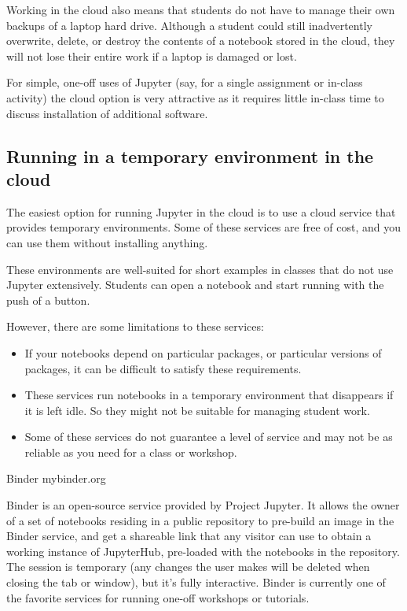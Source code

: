 \documentclass[]{book}
\let\BeginKnitrBlock\begin \let\EndKnitrBlock\end
\begin{document}
Working in the cloud also means that students do not have to manage
their own backups of a laptop hard drive. Although a student could
still inadvertently overwrite, delete, or destroy the contents of a
notebook stored in the cloud, they will not lose their entire work if
a laptop is damaged or lost.

For simple, one-off uses of Jupyter (say, for a single assignment or
in-class activity) the cloud option is very attractive as it requires
little in-class time to discuss installation of additional software.

\hypertarget{running-in-a-temporary-environment-in-the-cloud}{%
\subsection{Running in a temporary environment in the cloud}\label{running-in-a-temporary-environment-in-the-cloud}}

The easiest option for running Jupyter in the cloud is to use a cloud
service that provides temporary environments. Some of these services
are free of cost, and you can use them without installing anything.

These environments are well-suited for short examples in classes that
do not use Jupyter extensively. Students can open a notebook and
start running with the push of a button.

However, there are some limitations to these services:

\begin{itemize}
\item
  If your notebooks depend on particular packages, or particular
  versions of packages, it can be difficult to satisfy these
  requirements.
\item
  These services run notebooks in a temporary environment that
  disappears if it is left idle. So they might not be suitable for
  managing student work.
\item
  Some of these services do not guarantee a level of service and may
  not be as reliable as you need for a class or workshop.
\end{itemize}

\BeginKnitrBlock{rmdnote}
Binder mybinder.org

Binder is an
open-source service provided by Project Jupyter. It allows the
owner of a set of notebooks residing in a public repository to
pre-build an image in the Binder service, and get a shareable
link that any visitor can use to obtain a working instance of
JupyterHub, pre-loaded with the notebooks in the repository. The session is
temporary (any changes the user makes will be deleted when
closing the tab or window), but it's fully interactive. Binder
is currently one of the favorite services for running one-off
workshops or tutorials.
\EndKnitrBlock{rmdnote}
\end{document}

